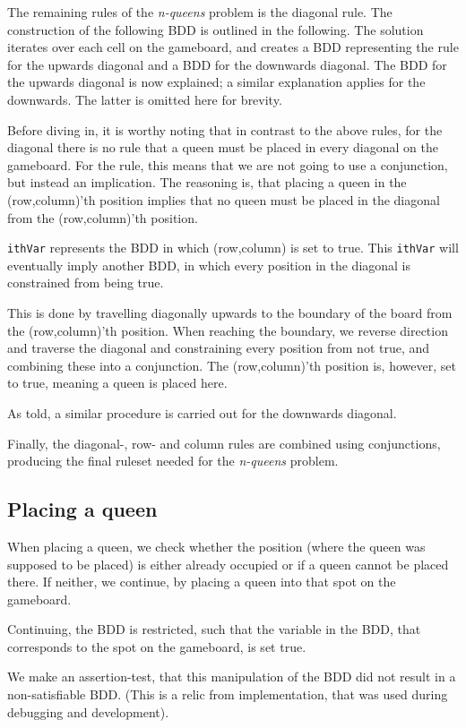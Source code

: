 \newpar The remaining rules of the \textit{n-queens} problem is the diagonal rule. The construction of the following BDD is outlined in the following. 
The solution iterates over each cell on the gameboard, and creates a BDD representing the rule for the upwards diagonal and a BDD for the downwards diagonal. The BDD for the upwards diagonal is now explained; a similar explanation applies for the downwards. The latter is omitted here for brevity.

Before diving in, it is worthy noting that in contrast to the above rules, for the diagonal there is no rule that a queen must be placed in every diagonal on the gameboard. For the rule, this means that we are not going to use a conjunction, but instead an implication. The reasoning is, that placing a queen in the (row,column)'th position implies that no queen must be placed in the diagonal from the (row,column)'th position.

\newpar\texttt{ithVar} represents the BDD in which (row,column) is set to true. This \texttt{ithVar} will eventually imply another BDD, in which every position in the diagonal is constrained from being true.

This is done by travelling diagonally upwards to the boundary of the board from the (row,column)'th position. When reaching the boundary, we reverse direction and traverse the diagonal and constraining every position from not true, and combining these into a conjunction. The  (row,column)'th position is, however, set to true, meaning a queen is placed here.

As told, a similar procedure is carried out for the downwards diagonal.

\newpar Finally, the diagonal-, row- and column rules are combined using conjunctions, producing the final ruleset needed for the \textit{n-queens} problem. 

\subsection{Placing a queen}
When placing a queen, we check whether the position (where the queen was supposed to be placed) is either already occupied or if a queen cannot be placed there. If neither, we continue, by placing a queen into that spot on the gameboard.

\newpar Continuing, the BDD is restricted, such that the variable in the BDD, that corresponds to the spot on the gameboard, is set true.

\newpar We make an assertion-test, that this manipulation of the BDD did not result in a non-satisfiable BDD. (This is a relic from implementation, that was used during debugging and development). 

